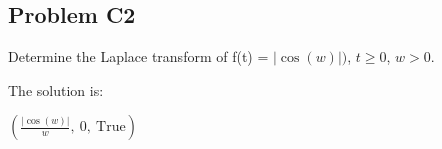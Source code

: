 \subsection{Problem C2} Determine the Laplace transform of f(t) = \(\left|{\cos{\left(w \right)}}\right|)\), \(t \geq 0\), \(w > 0\).

    \medskip
    The solution is:

    \smallskip
     \(\left( \frac{\left|{\cos{\left(w \right)}}\right|}{w}, \  0, \  \text{True}\right)\)
